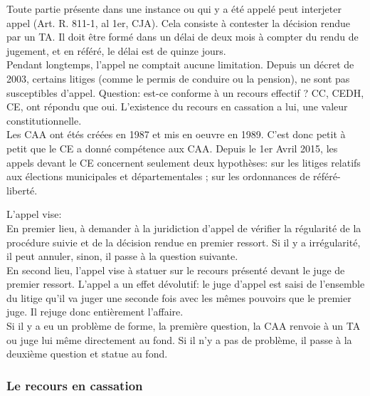 \documentclass[10pt, a4paper, openany]{book}
\begin{document}
Toute partie présente dans une instance ou qui y a été appelé peut interjeter appel (Art. R. 811-1, al 1er, CJA). Cela consiste à contester la décision rendue par un TA. Il doit être formé dans un délai de deux mois à compter du rendu de jugement, et en référé, le délai est de quinze jours. \\
Pendant longtemps, l'appel ne comptait aucune limitation. Depuis un décret de 2003, certains litiges (comme le permis de conduire ou la pension), ne sont pas susceptibles d'appel. Question: est-ce conforme à un recours effectif ? CC, CEDH, CE, ont répondu que oui. L'existence du recours en cassation a lui, une valeur constitutionnelle. \\
Les CAA ont étés créées en 1987 et mis en oeuvre en 1989. C'est donc petit à petit que le CE a donné compétence aux CAA. Depuis le 1er Avril 2015, les appels devant le CE concernent seulement deux hypothèses: sur les litiges relatifs aux élections municipales et départementales ; sur les ordonnances de référé-liberté. 


L'appel vise: \\
En premier lieu, à demander à la juridiction d'appel de vérifier la régularité de la procédure suivie et de la décision rendue en premier ressort. Si il y a irrégularité, il peut annuler, sinon, il passe à la question suivante. \\
En second lieu, l'appel vise à statuer sur le recours présenté devant le juge de premier ressort. L'appel a un effet dévolutif: le juge d'appel est saisi de l'ensemble du litige qu'il va juger une seconde fois avec les mêmes pouvoirs que le premier juge. Il rejuge donc entièrement l'affaire. \\
Si il y a eu un problème de forme, la première question, la CAA renvoie à un TA ou juge lui même directement au fond. Si il n'y a pas de problème, il passe à la deuxième question et statue au fond.

\subsubsection{Le recours en cassation}
\end{document}
